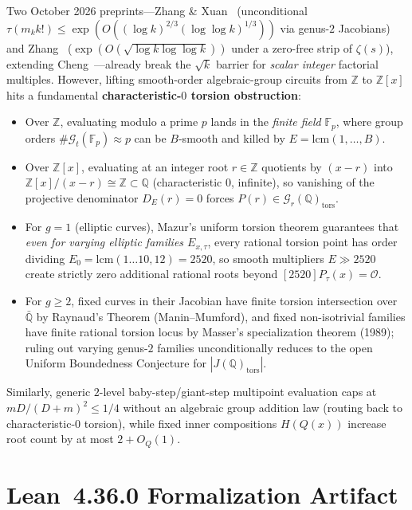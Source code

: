 \documentclass[11pt]{article}
\newcommand{\Z}{\mathbb{Z}}
\newcommand{\Q}{\mathbb{Q}}
\newcommand{\F}{\mathbb{F}}
\begin{document}
Two October 2026 preprints---Zhang \& Xuan~\cite{ZhangXuan2026} (unconditional $\tau(m_k k!) \le \exp(O((\log k)^{2/3}(\log\log k)^{1/3}))$ via genus-$2$ Jacobians) and Zhang~\cite{Zhang2026} ($\exp(O(\sqrt{\log k \log\log k}))$ under a zero-free strip of $\zeta(s)$), extending Cheng~\cite{Cheng2004}---already break the $\sqrt{k}$ barrier for \emph{scalar integer} factorial multiples. However, lifting smooth-order algebraic-group circuits from $\Z$ to $\Z[x]$ hits a fundamental \textbf{characteristic-$0$ torsion obstruction}:
\begin{itemize}[leftmargin=1.5em]
  \item Over $\Z$, evaluating modulo a prime $p$ lands in the \emph{finite field} $\F_p$, where group orders $\#\mathcal{G}_t(\F_p) \approx p$ can be $B$-smooth and killed by $E = \mathrm{lcm}(1, \dots, B)$.
  \item Over $\Z[x]$, evaluating at an integer root $r \in \Z$ quotients by $(x - r)$ into $\Z[x]/(x - r) \cong \Z \subset \Q$ (characteristic $0$, infinite), so vanishing of the projective denominator $D_E(r) = 0$ forces $P(r) \in \mathcal{G}_r(\Q)_{\mathrm{tors}}$.
  \item For $g = 1$ (elliptic curves), Mazur's uniform torsion theorem guarantees that \emph{even for varying elliptic families $E_{x,\tau}$}, every rational torsion point has order dividing $E_0 = \mathrm{lcm}(1 \dots 10, 12) = 2520$, so smooth multipliers $E \gg 2520$ create strictly zero additional rational roots beyond $[2520] P_\tau(x) = \mathcal{O}$.
  \item For $g \ge 2$, fixed curves in their Jacobian have finite torsion intersection over $\bar{\Q}$ by Raynaud's Theorem (Manin--Mumford), and fixed non-isotrivial families have finite rational torsion locus by Masser's specialization theorem (1989); ruling out varying genus-$2$ families unconditionally reduces to the open Uniform Boundedness Conjecture for $|J(\Q)_{\mathrm{tors}}|$.
\end{itemize}
Similarly, generic $2$-level baby-step/giant-step multipoint evaluation caps at $m D / (D + m)^2 \le 1/4$ without an algebraic group addition law (routing back to characteristic-$0$ torsion), while fixed inner compositions $H(Q(x))$ increase root count by at most $2 + O_Q(1)$.

\section{Lean~4.36.0 Formalization Artifact}\label{sec:lean}
\end{document}
